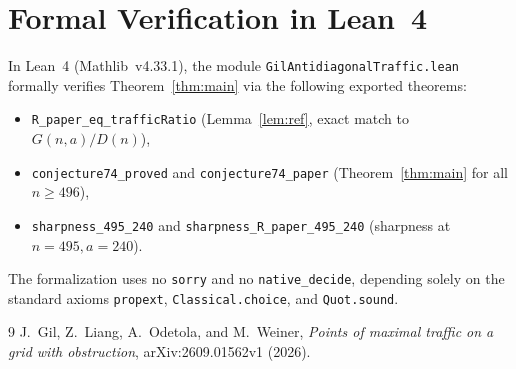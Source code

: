 \documentclass[11pt]{article}
\begin{document}
\section{Formal Verification in Lean~4}
In Lean~4 (Mathlib~v4.33.1), the module \texttt{GilAntidiagonalTraffic.lean} formally verifies Theorem~\ref{thm:main} via the following exported theorems:
\begin{itemize}
\item \texttt{R\_paper\_eq\_trafficRatio} (Lemma~\ref{lem:ref}, exact match to $G(n,a)/D(n)$),
\item \texttt{conjecture74\_proved} and \texttt{conjecture74\_paper} (Theorem~\ref{thm:main} for all $n \ge 496$),
\item \texttt{sharpness\_495\_240} and \texttt{sharpness\_R\_paper\_495\_240} (sharpness at $n = 495, a = 240$).
\end{itemize}
The formalization uses no \texttt{sorry} and no \texttt{native\_decide}, depending solely on the standard axioms \texttt{propext}, \texttt{Classical.choice}, and \texttt{Quot.sound}.

\begin{thebibliography}{9}
J.~Gil, Z.~Liang, A.~Odetola, and M.~Weiner, \emph{Points of maximal traffic on a grid with obstruction}, arXiv:2609.01562v1 (2026).
\end{thebibliography}
\end{document}
